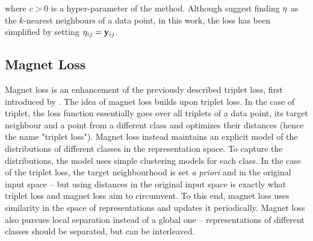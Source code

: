 where \( c > 0 \) is a hyper-parameter of the method. Although \cite{weinberger_distance_2006} suggest finding \( \mathbf{\eta} \) as the \( k \)-nearest neighbours of a data point, in this work, the loss has been simplified by setting \( \mathbf{\eta}_{ij} = \mathbf{y}_{ij} \).

\subsection{Magnet Loss}
Magnet loss is an enhancement of the previously described triplet loss, first introduced by \cite{rippel_metric_2015}. The idea of magnet loss builds upon triplet loss. In the case of triplet, the loss function essentially goes over all triplets of a data point, its target neighbour and a point from a different class and optimizes their distances (hence the name "triplet loss"). Magnet loss instead maintains an explicit model of the distributions of different classes in the representation space. To capture the distributions, the model uses simple clustering models for each class. In the case of the triplet loss, the target neighbourhood is set \textit{a priori} and in the original input space -- but using distances in the original input space is exactly what triplet loss and magnet loss aim to circumvent. To this end, magnet loss uses similarity in the space of representations and updates it periodically. Magnet loss also pursues local separation instead of a global one -- representations of different classes should be separated, but can be interleaved.

